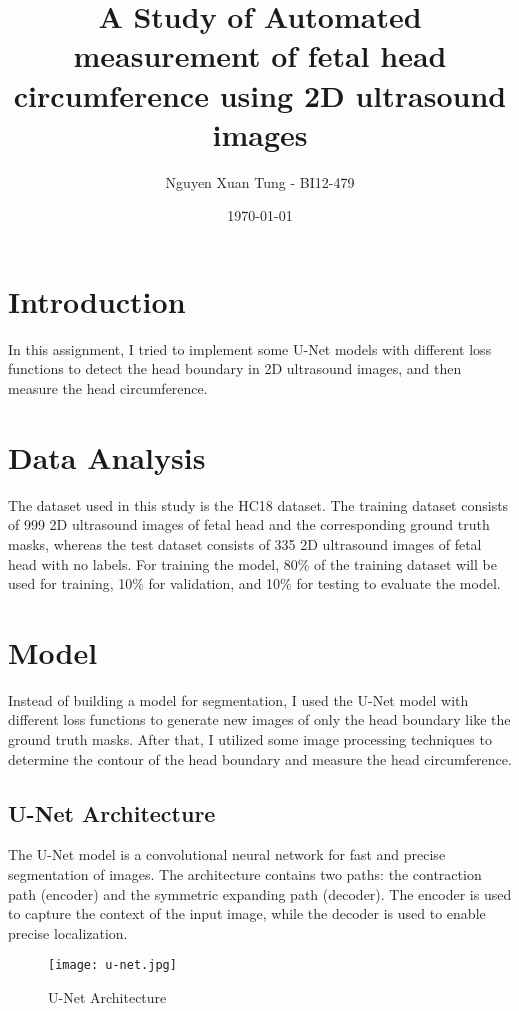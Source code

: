 \documentclass{article}
\title{A Study of Automated measurement of fetal head circumference using 2D ultrasound images}
\author{Nguyen Xuan Tung - BI12-479}
\date{\today}
\begin{document}
\maketitle
\section{Introduction}
In this assignment, I tried to implement some U-Net models with different loss functions to 
detect the head boundary in 2D ultrasound images, and then measure the head circumference.

\section{Data Analysis}
The dataset used in this study is the HC18 dataset. The training dataset consists of 999 2D ultrasound images of fetal head 
and the corresponding ground truth masks, whereas the test dataset consists of 335 2D ultrasound images of fetal head with no labels.
For training the model, 80\% of the training dataset will be used for training, 10\% for validation, and 10\% for testing to  
evaluate the model.\\ 

\section{Model}
Instead of building a model for segmentation, I used the U-Net model with different loss functions 
to generate new images of only the head boundary like the ground truth masks. After that, I utilized
some image processing techniques to determine the contour of the head boundary and measure the head circumference.

\subsection{U-Net Architecture}
The U-Net model is a convolutional neural network for fast and precise segmentation of images.
The architecture contains two paths: the contraction path (encoder) and the symmetric expanding path (decoder).
The encoder is used to capture the context of the input image, while the decoder is used to enable precise localization.

\begin{figure}[h]
    \centering
    \texttt{[image: u-net.jpg]}
    \caption{U-Net Architecture}
\end{figure}
\end{document}
